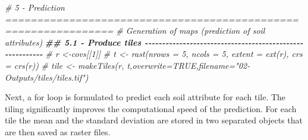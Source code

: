 \documentclass[
  10pt,
  b5paper,
  oneside]{book}
\newenvironment{Shaded}{\begin{snugshade}}{\end{snugshade}}
\newcommand{\CommentTok}[1]{\textcolor[rgb]{0.56,0.35,0.01}{\textit{#1}}}
\newcommand{\DocumentationTok}[1]{\textcolor[rgb]{0.56,0.35,0.01}{\textbf{\textit{#1}}}}
\begin{document}
\begin{Shaded}
\begin{Highlighting}[]
  \CommentTok{\# 5 {-} Prediction ===============================================================}
  \CommentTok{\# Generation of maps (prediction of soil attributes) }
  \DocumentationTok{\#\# 5.1 {-} Produce tiles {-}{-}{-}{-}{-}{-}{-}{-}{-}{-}{-}{-}{-}{-}{-}{-}{-}{-}{-}{-}{-}{-}{-}{-}{-}{-}{-}{-}{-}{-}{-}{-}{-}{-}{-}{-}{-}{-}{-}{-}{-}{-}{-}{-}{-}{-}{-}{-}{-}{-}{-}{-}{-}{-}{-}{-}{-}}
  \CommentTok{\# r \textless{}{-}covs[[1]]}
  \CommentTok{\# t \textless{}{-} rast(nrows = 5, ncols = 5, extent = ext(r), crs = crs(r))}
  \CommentTok{\# tile \textless{}{-} makeTiles(r, t,overwrite=TRUE,filename="02{-}Outputs/tiles/tiles.tif")}
\end{Highlighting}
\end{Shaded}

Next, a for loop is formulated to predict each soil attribute for each tile. The tiling significantly improves the computational speed of the prediction. For each tile the mean and the standard deviation are stored in two separated objects that are then saved as raster files.
\end{document}

